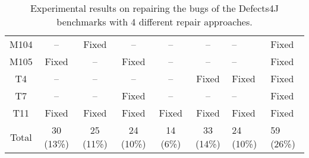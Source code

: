 \begin{table}[!t]
{\begin{tabular}{|c|c|c|c|c|c|}
M104              & --        & Fixed     & --        & --        & --        & --        &Fixed   \\
M105              & Fixed     & --        & Fixed     & --        & --        & --        &Fixed   \\
\hline
T4                & --        & --        & --        & --        & Fixed     & Fixed     &Fixed   \\
T7                & --        & --        & Fixed     & --        & --        & --        &Fixed   \\
T11               & Fixed     & Fixed     & Fixed     & Fixed     & Fixed     & Fixed     &Fixed   \\
\hline
Total             & 30 (13\%) & 25 (11\%) & 24 (10\%) & 14 (6\%)  & 33 (14\%) & 24 (10\%) & 59 (26\%)\\
\hline 
\end{tabular}%
}
\caption{Experimental results on repairing the bugs of the Defects4J benchmarks with 4 different repair approaches.}
\end{table}

